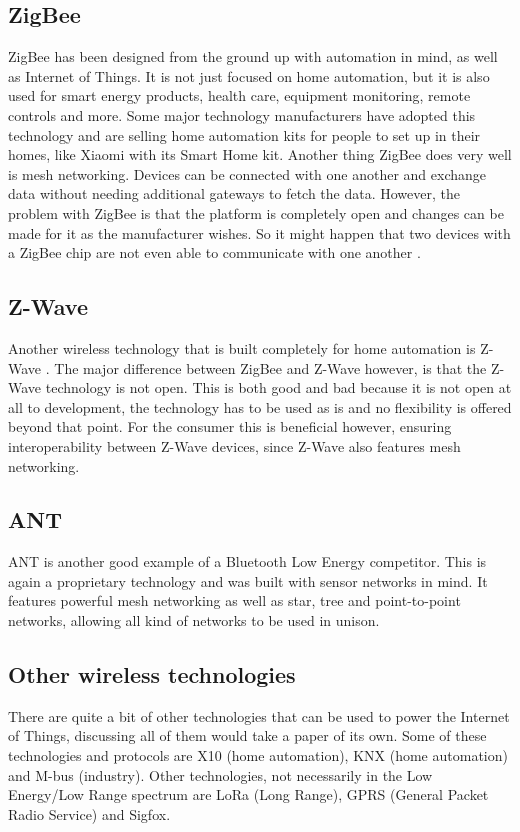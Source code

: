 \documentclass[pdftex,a4paper,12pt,twoside]{report}
\begin{document}
\subsection{ZigBee}
\label{subsec:zigbee}
ZigBee \citep{zigbee2016} has been designed from the ground up with automation in mind, as well as Internet of Things. It is not just focused on home automation, but it is also used for smart energy products, health care, equipment monitoring, remote controls and more. Some major technology manufacturers have adopted this technology and are selling home automation kits for people to set up in their homes, like Xiaomi with its Smart Home kit. Another thing ZigBee does very well is mesh networking. Devices can be connected with one another and exchange data without needing additional gateways to fetch the data. However, the problem with ZigBee is that the platform is completely open and changes can be made for it as the manufacturer wishes. So it might happen that two devices with a ZigBee chip are not even able to communicate with one another \citep{colitti2014}.

\subsection{Z-Wave}
\label{subsec:zwave}
Another wireless technology that is built completely for home automation is Z-Wave \citep{zwave2016}. The major difference between ZigBee and Z-Wave however, is that the Z-Wave technology is not open. This is both good and bad because it is not open at all to development, the technology has to be used as is and no flexibility is offered beyond that point. For the consumer this is beneficial however, ensuring interoperability between Z-Wave devices, since Z-Wave also features mesh networking.

\subsection{ANT}
\label{subsec:ant}
ANT \citep{ant2016} is another good example of a Bluetooth Low Energy competitor. This is again a proprietary technology and was built with sensor networks in mind. It features powerful mesh networking as well as star, tree and point-to-point networks, allowing all kind of networks to be used in unison.

\subsection{Other wireless technologies}
\label{subsec:othertechnologies}
There are quite a bit of other technologies that can be used to power the Internet of Things, discussing all of them would take a paper of its own. Some of these technologies and protocols are X10 (home automation), KNX (home automation) and M-bus (industry). Other technologies, not necessarily in the Low Energy/Low Range spectrum are LoRa (Long Range), GPRS (General Packet Radio Service) and Sigfox.
\end{document}
